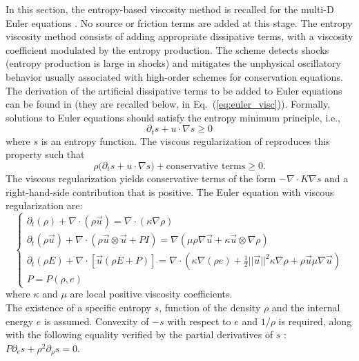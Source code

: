 \documentclass[12pt]{article}
\newcommand{\eqt}[1]{Eq.~(\ref{#1})} %
\renewcommand{\div}{\nabla \cdot}
\newcommand{\grad}{\nabla}
\begin{document}
In this section, the entropy-based viscosity method \cite{valentin, jlg1, jlg2} is recalled for the multi-D Euler equations \cite{Toro}. No source or friction terms are added at this stage. The entropy viscosity method consists of adding appropriate dissipative terms, with a viscosity coefficient modulated by the entropy production. The scheme detects shocks (entropy production is large in shocks) and mitigates the unphysical oscillatory behavior usually associated with high-order schemes for conservation equations. The derivation of the artificial dissipative terms to be added to Euler equations can be found in \cite{jlg} (they are recalled below, in \eqt{eq:euler_visc}). Formally, solutions to Euler equations should satisfy the entropy minimum principle, i.e., 
\begin{equation}
\partial _t s + u \cdot \grad s \ge 0 
\end{equation}
where $s$ is an entropy function. The viscous regularization of \cite{jlg} reproduces this property such that
\begin{equation}
\rho \big( \partial _t s + u \cdot \grad s \big) + \text{conservative terms} \ge 0 .
\end{equation}
The viscous regularization yields conservative terms of the form $-\div K \grad s$ and a right-hand-side contribution that is positive. The Euler equation with viscous regularization are:
\begin{equation}
\label{eq:euler_visc}
\left\{ 
\begin{array}{lll}
\partial_t \left( \rho \right) + \nabla \cdot \left( \rho \vec{u} \right) = \nabla \cdot \left( \kappa \nabla \rho \right) \\
\partial_t \left( \rho \vec{u} \right) + \nabla \cdot \left( \rho \vec{u} \otimes \vec{u} + P I \right) = \nabla \left( \mu \rho \nabla \vec{u}  + \kappa \vec{u} \otimes \nabla \rho \right)  \\
\partial_t \left( \rho E \right) + \nabla \cdot \left[ \vec{u} \left( \rho E + P \right) \right] = \nabla \cdot \left( \kappa \nabla \left( \rho e \right) + \frac{1}{2}|| \vec{u} ||^2 \kappa \nabla \rho +  \rho \vec{u} \mu \nabla \vec{u}  \right) \\
P = P\left( \rho, e \right)
\end{array}
\right.
\end{equation}
where $\kappa$ and $\mu$ are local positive viscosity coefficients. \\
The existence of a specific entropy $s$, function of the density $\rho$ and the internal energy $e$ is assumed. Convexity of $-s$ with respect to $e$ and $1/\rho$ is required, along with the following equality verified by the partial derivatives of $s$ : $P \partial_e s + \rho^2 \partial_{\rho} s = 0$.
\end{document}
